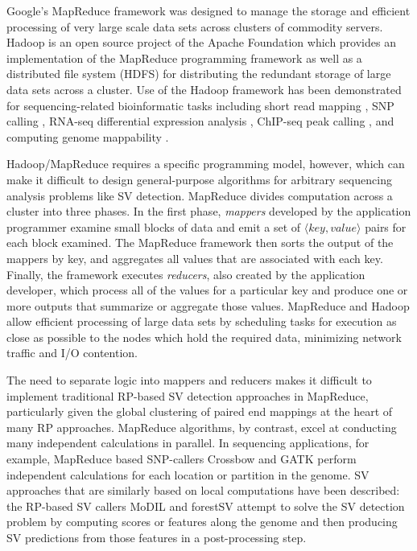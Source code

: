 \documentclass[11pt]{article}
\begin{document}
Google's MapReduce \autocite{Dean:2008p277} framework was designed to manage the storage and efficient processing of very large scale data sets across clusters of commodity servers. Hadoop is an open source project of the Apache Foundation which provides an implementation of the MapReduce programming framework as well as a distributed file system (HDFS) for distributing the redundant storage of large data sets across a cluster. Use of the Hadoop framework has been demonstrated for sequencing-related bioinformatic tasks including short read mapping \autocite{Schatz:2009p278}, SNP calling \autocite{Langmead:2009p1225}, RNA-seq differential expression analysis \autocite{Langmead:2010p1268}, ChIP-seq peak calling \autocite{Feng:2011p1228}, and computing genome mappability \autocite{Lee:2012bk}. 

Hadoop/MapReduce requires a specific programming model, however, which can make it difficult to design general-purpose algorithms for arbitrary sequencing analysis problems like SV detection. MapReduce \autocite{Dean:2008p277} divides computation across a cluster into three phases. In the first phase, \emph{mappers} developed by the application programmer examine small blocks of data and emit a set of $\langle key, value \rangle$ pairs for each block examined. The MapReduce framework then sorts the output of the mappers by key, and aggregates all values that are associated with each key. Finally, the framework executes \emph{reducers}, also created by the application developer, which process all of the values for a particular key and produce one or more outputs that summarize or aggregate those values. MapReduce and Hadoop allow efficient processing of large data sets by scheduling tasks for execution as close as possible to the nodes which hold the required data, minimizing network traffic and I/O contention.

The need to separate logic into mappers and reducers makes it difficult to implement traditional RP-based SV detection approaches in MapReduce, particularly given the global clustering of paired end mappings at the heart of many RP approaches. MapReduce algorithms, by contrast, excel at conducting many independent calculations in parallel. In sequencing applications, for example, MapReduce based SNP-callers Crossbow \autocite{Langmead:2009p1225} and GATK \autocite{McKenna:2010p1051} perform independent calculations for each location or partition in the genome. SV approaches that are similarly based on local computations have been described: the RP-based SV callers MoDIL \autocite{Lee:2009da} and forestSV \autocite{Michaelson:2012fj} attempt to solve the SV detection problem by computing scores or features along the genome and then producing SV predictions from those features in a post-processing step. 
\end{document}
